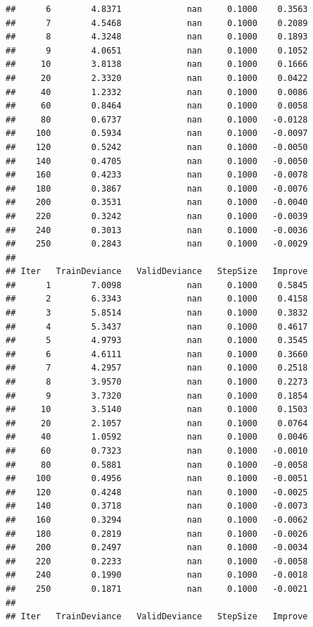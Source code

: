 \documentclass[]{book}
\begin{document}
\begin{verbatim}
##      6        4.8371             nan     0.1000    0.3563
##      7        4.5468             nan     0.1000    0.2089
##      8        4.3248             nan     0.1000    0.1893
##      9        4.0651             nan     0.1000    0.1052
##     10        3.8138             nan     0.1000    0.1666
##     20        2.3320             nan     0.1000    0.0422
##     40        1.2332             nan     0.1000    0.0086
##     60        0.8464             nan     0.1000    0.0058
##     80        0.6737             nan     0.1000   -0.0128
##    100        0.5934             nan     0.1000   -0.0097
##    120        0.5242             nan     0.1000   -0.0050
##    140        0.4705             nan     0.1000   -0.0050
##    160        0.4233             nan     0.1000   -0.0078
##    180        0.3867             nan     0.1000   -0.0076
##    200        0.3531             nan     0.1000   -0.0040
##    220        0.3242             nan     0.1000   -0.0039
##    240        0.3013             nan     0.1000   -0.0036
##    250        0.2843             nan     0.1000   -0.0029
## 
## Iter   TrainDeviance   ValidDeviance   StepSize   Improve
##      1        7.0098             nan     0.1000    0.5845
##      2        6.3343             nan     0.1000    0.4158
##      3        5.8514             nan     0.1000    0.3832
##      4        5.3437             nan     0.1000    0.4617
##      5        4.9793             nan     0.1000    0.3545
##      6        4.6111             nan     0.1000    0.3660
##      7        4.2957             nan     0.1000    0.2518
##      8        3.9570             nan     0.1000    0.2273
##      9        3.7320             nan     0.1000    0.1854
##     10        3.5140             nan     0.1000    0.1503
##     20        2.1057             nan     0.1000    0.0764
##     40        1.0592             nan     0.1000    0.0046
##     60        0.7323             nan     0.1000   -0.0010
##     80        0.5881             nan     0.1000   -0.0058
##    100        0.4956             nan     0.1000   -0.0051
##    120        0.4248             nan     0.1000   -0.0025
##    140        0.3718             nan     0.1000   -0.0073
##    160        0.3294             nan     0.1000   -0.0062
##    180        0.2819             nan     0.1000   -0.0026
##    200        0.2497             nan     0.1000   -0.0034
##    220        0.2233             nan     0.1000   -0.0058
##    240        0.1990             nan     0.1000   -0.0018
##    250        0.1871             nan     0.1000   -0.0021
## 
## Iter   TrainDeviance   ValidDeviance   StepSize   Improve

\end{verbatim}
\end{document}
